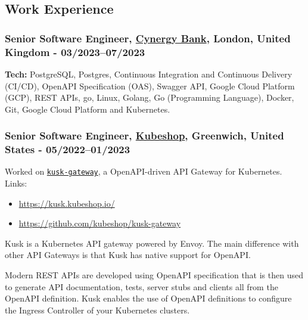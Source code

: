 \documentclass[
  a4paper,
]{article}
\providecommand{\tightlist}{%
  \setlength{\itemsep}{0pt}\setlength{\parskip}{0pt}}
\begin{document}
\hypertarget{work-experience}{%
\subsection{Work Experience}\label{work-experience}}

\hypertarget{senior-software-engineer-cynergy-bank-london-united-kingdom---032023072023}{%
\subsubsection{\texorpdfstring{Senior Software Engineer,
\href{https://cynergybank.co.uk}{Cynergy Bank}, London, United Kingdom -
03/2023--07/2023}{Senior Software Engineer, Cynergy Bank, London, United Kingdom - 03/2023--07/2023}}\label{senior-software-engineer-cynergy-bank-london-united-kingdom---032023072023}}

\textbf{Tech:} PostgreSQL, Postgres, Continuous Integration and
Continuous Delivery (CI/CD), OpenAPI Specification (OAS), Swagger API,
Google Cloud Platform (GCP), REST APIs, go, Linux, Golang, Go
(Programming Language), Docker, Git, Google Cloud Platform and
Kubernetes.

\hypertarget{senior-software-engineer-kubeshop-greenwich-united-states---052022012023}{%
\subsubsection{\texorpdfstring{Senior Software Engineer,
\href{https://kubeshop.io/}{Kubeshop}, Greenwich, United States -
05/2022--01/2023}{Senior Software Engineer, Kubeshop, Greenwich, United States - 05/2022--01/2023}}\label{senior-software-engineer-kubeshop-greenwich-united-states---052022012023}}

Worked on \href{https://docs.kusk.io/}{\texttt{kusk-gateway}}, a
OpenAPI-driven API Gateway for Kubernetes. Links:

\begin{itemize}
\tightlist
\item
  \url{https://kusk.kubeshop.io/}
\item
  \url{https://github.com/kubeshop/kusk-gateway}
\end{itemize}

Kusk is a Kubernetes API gateway powered by Envoy. The main difference
with other API Gateways is that Kusk has native support for OpenAPI.

Modern REST APIs are developed using OpenAPI specification that is then
used to generate API documentation, tests, server stubs and clients all
from the OpenAPI definition. Kusk enables the use of OpenAPI definitions
to configure the Ingress Controller of your Kubernetes clusters.
\end{document}
